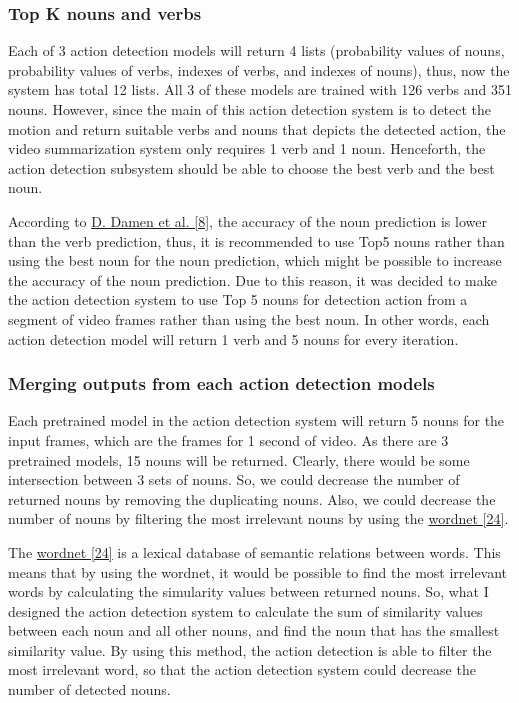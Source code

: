 \documentclass{article}
\begin{document}
\subsubsection{Top K nouns and verbs}

Each of 3 action detection models will return 4 lists (probability values of nouns, probability values of verbs, indexes of verbs, and indexes of nouns), thus, now the system has total 12 lists. All 3 of these models are trained with 126 verbs and 351 nouns. However, since the main of this action detection system is to detect the motion and return suitable verbs and nouns that depicts the detected action, the video summarization system only requires 1 verb and 1 noun. Henceforth, the action detection subsystem should be able to choose the best verb and the best noun.

According to \hyperlink{ref8}{D. Damen et al. [8]}, the accuracy of the noun prediction is lower than the verb prediction, thus, it is recommended to use Top5 nouns rather than using the best noun for the noun prediction, which might be possible to increase the accuracy of the noun prediction. Due to this reason, it was decided to make the action detection system to use Top 5 nouns for detection action from a segment of video frames rather than using the best noun. In other words, each action detection model will return 1 verb and 5 nouns for every iteration.

\subsubsection{Merging outputs from each action detection models}

Each pretrained model in the action detection system will return 5 nouns for the input frames, which are the frames for 1 second of video. As there are 3 pretrained models, 15 nouns will be returned. Clearly, there would be some intersection between 3 sets of nouns. So, we could decrease the number of returned nouns by removing the duplicating nouns. Also, we could decrease the number of nouns by filtering the most irrelevant nouns by using the \hyperlink{ref24}{wordnet [24]}.

The \hyperlink{ref24}{wordnet [24]} is a lexical database of semantic relations between words. This means that by using the wordnet, it would be possible to find the most irrelevant words by calculating the simularity values between returned nouns. So, what I designed the action detection system to calculate the sum of similarity values between each noun and all other nouns, and find the noun that has the smallest similarity value. By using this method, the action detection is able to filter the most irrelevant word, so that the action detection system could decrease the number of detected nouns.
\end{document}

